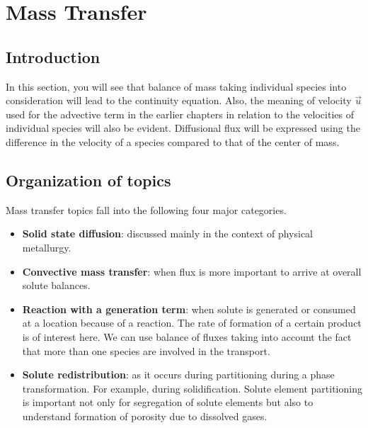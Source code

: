 \chapter{Mass Transfer}

\section{Introduction}

In this section, you will see that balance of mass taking individual species
into consideration will lead to the continuity equation. Also, the meaning of
velocity $\vec{u}$ used for the advective term in the earlier chapters in
relation to the velocities of individual species will also be evident.
Diffusional flux will be expressed using the difference in the velocity of a
species compared to that of the center of mass.


\section{Organization of topics}

Mass transfer topics fall into the following four major categories.
\begin{itemize}
\item \textbf{Solid state diffusion}: discussed mainly in the context of
physical metallurgy.
\item \textbf{Convective mass transfer}: when flux is more important to arrive at overall solute balances.
\item \textbf{Reaction with a generation term}: when solute is generated or
consumed at a location because of a reaction. The rate of formation of a certain
product is of interest here. We can use balance of fluxes taking into account
the fact that more than one species are involved in the transport.
\item \textbf{Solute redistribution}: as it occurs during partitioning during a phase transformation. For example, during solidification. Solute element partitioning is important not only for segregation of solute elements but also to understand formation of porosity due to dissolved gases.
\end{itemize}

